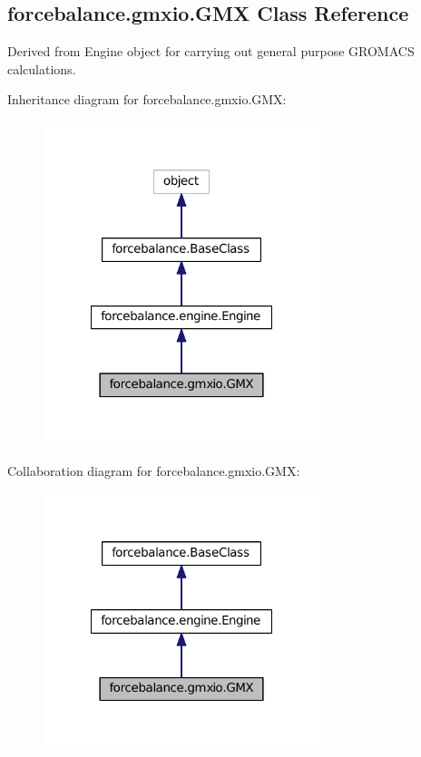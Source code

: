 \hypertarget{classforcebalance_1_1gmxio_1_1GMX}{\subsection{forcebalance.\-gmxio.\-G\-M\-X Class Reference}
\label{classforcebalance_1_1gmxio_1_1GMX}
}


Derived from Engine object for carrying out general purpose G\-R\-O\-M\-A\-C\-S calculations.  




Inheritance diagram for forcebalance.\-gmxio.\-G\-M\-X\-:\nopagebreak
\begin{figure}[H]
\begin{center}
\leavevmode
\includegraphics[width=228pt]{classforcebalance_1_1gmxio_1_1GMX__inherit__graph}
\end{center}
\end{figure}


Collaboration diagram for forcebalance.\-gmxio.\-G\-M\-X\-:\nopagebreak
\begin{figure}[H]
\begin{center}
\leavevmode
\includegraphics[width=228pt]{classforcebalance_1_1gmxio_1_1GMX__coll__graph}
\end{center}
\end{figure}
